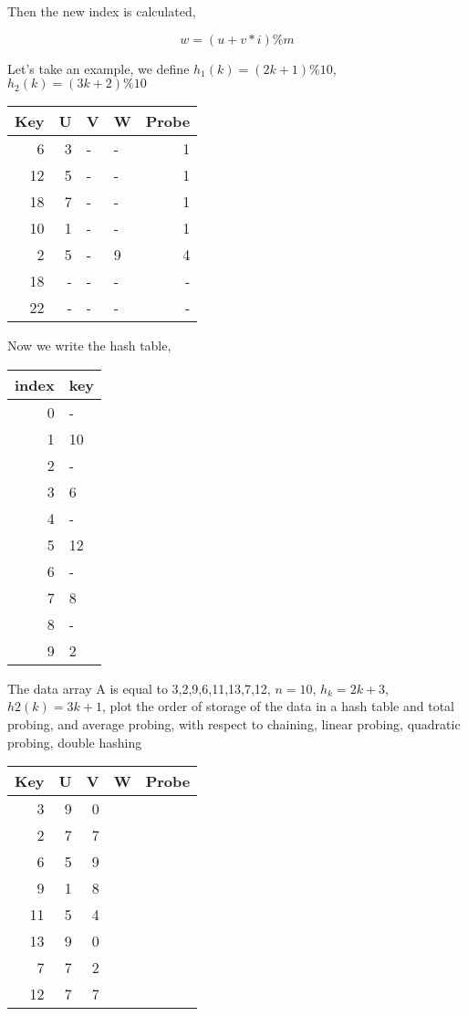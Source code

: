 \documentclass[11pt]{article}
\begin{document}
Then the new index is calculated,

$$w = (u+v*i)\%m$$

Let's take an example, we define \(h_1(k) = (2k+1)\%10\), \(h_2(k) = (3k+2)\%10\)

\begin{center}
\begin{tabular}{rrllr}
\hline
Key & U & V & W & Probe\\
\hline
6 & 3 & - & - & 1\\
12 & 5 & - & - & 1\\
18 & 7 & - & - & 1\\
10 & 1 & - & - & 1\\
2 & 5 & - & 9 & 4\\
18 & - & - & - & -\\
22 & - & - & - & -\\
\hline
\end{tabular}
\end{center}


Now we write the hash table,
\begin{center}
\begin{tabular}{rl}
\hline
\textbf{index} & \textbf{key}\\
\hline
0 & -\\
1 & 10\\
2 & -\\
3 & 6\\
4 & -\\
5 & 12\\
6 & -\\
7 & 8\\
8 & -\\
9 & 2\\
\hline
\end{tabular}
\end{center}
The data array A is equal to 3,2,9,6,11,13,7,12, \(n = 10\), \(h_k = 2k + 3\), \(h2(k) = 3k + 1\), plot the order of storage  of the data in a hash table and total probing, and average probing, with respect to chaining, linear probing, quadratic probing, double hashing
\begin{center}
\begin{tabular}{rrrll}
\hline
Key & U & V & W & Probe\\
\hline
3 & 9 & 0 &  & \\
2 & 7 & 7 &  & \\
6 & 5 & 9 &  & \\
9 & 1 & 8 &  & \\
11 & 5 & 4 &  & \\
13 & 9 & 0 &  & \\
7 & 7 & 2 &  & \\
12 & 7 & 7 &  & \\
\end{tabular}
\end{center}
\end{document}
